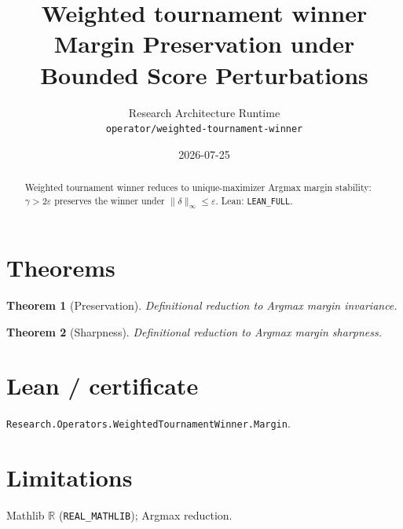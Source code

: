 \documentclass[11pt]{article}
\title{Weighted tournament winner Margin Preservation under Bounded Score Perturbations}
\author{Research Architecture Runtime \\ \texttt{operator/weighted-tournament-winner}}
\date{2026-07-25}
\newtheorem{theorem}{Theorem}
\begin{document}
\maketitle
\begin{abstract}
Weighted tournament winner reduces to unique-maximizer Argmax margin stability: $\gamma>2\varepsilon$
preserves the winner under $\|\delta\|_\infty\le\varepsilon$. Lean: \texttt{LEAN\_FULL}.
\end{abstract}
\section{Theorems}
\begin{theorem}[Preservation]
Definitional reduction to Argmax margin invariance.
\end{theorem}
\begin{theorem}[Sharpness]
Definitional reduction to Argmax margin sharpness.
\end{theorem}
\section{Lean / certificate}
\texttt{Research.Operators.WeightedTournamentWinner.Margin}.
\section{Limitations}
Mathlib $\mathbb{R}$ (\texttt{REAL\_MATHLIB}); Argmax reduction.
\end{document}
